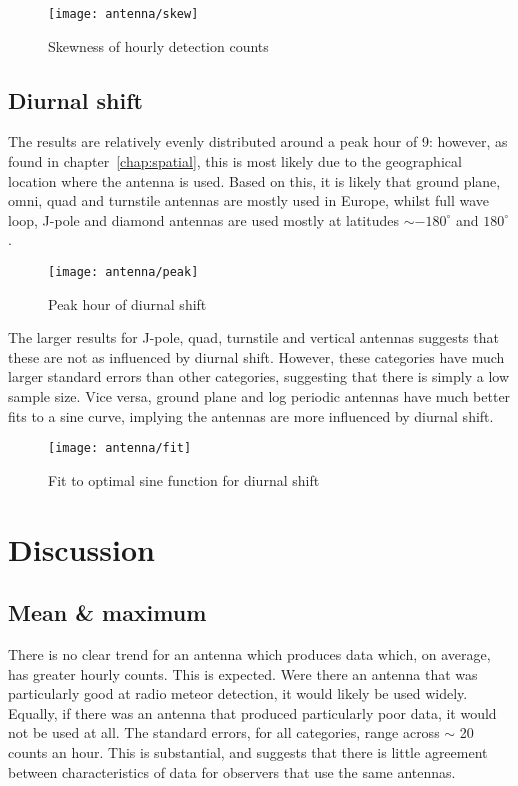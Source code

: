 \begin{figure}[h!]
	\centering
	\texttt{[image: antenna/skew]}
	\caption{Skewness of hourly detection counts
		\label{fig:ant:skew}}
\end{figure}

\subsection{Diurnal shift}
The results are relatively evenly distributed around a peak hour of 9: however, as found in chapter~\ref{chap:spatial}, this is most likely due to the geographical location where the antenna is used. Based on this, it is likely that ground plane, omni, quad and turnstile antennas are mostly used in Europe, whilst full wave loop, J-pole and diamond antennas are used mostly at latitudes ${\sim} -180^{\circ}$ and $180^{\circ}$.

\begin{figure}[h!]
	\centering
	\texttt{[image: antenna/peak]}
	\caption{Peak hour of diurnal shift
		\label{fig:ant:peak}}
\end{figure}

The larger results for J-pole, quad, turnstile and vertical antennas suggests that these are not as influenced by diurnal shift. However, these categories have much larger standard errors than other categories, suggesting that there is simply a low sample size. Vice versa, ground plane and log periodic antennas have much better fits to a sine curve, implying the antennas are more influenced by diurnal shift.
\begin{figure}[h!]
	\centering
	\texttt{[image: antenna/fit]}
	\caption{Fit to optimal sine function for diurnal shift
		\label{fig:ant:fit}}
\end{figure}

\section{Discussion}
\subsection{Mean \& maximum}
There is no clear trend for an antenna which produces data which, on average, has greater hourly counts. This is expected. Were there an antenna that was particularly good at radio meteor detection, it would likely be used widely. Equally, if there was an antenna that produced particularly poor data, it would not be used at all. The standard errors, for all categories, range across ${\sim}$ 20 counts an hour. This is substantial, and suggests that there is little agreement between characteristics of data for observers that use the same antennas.
